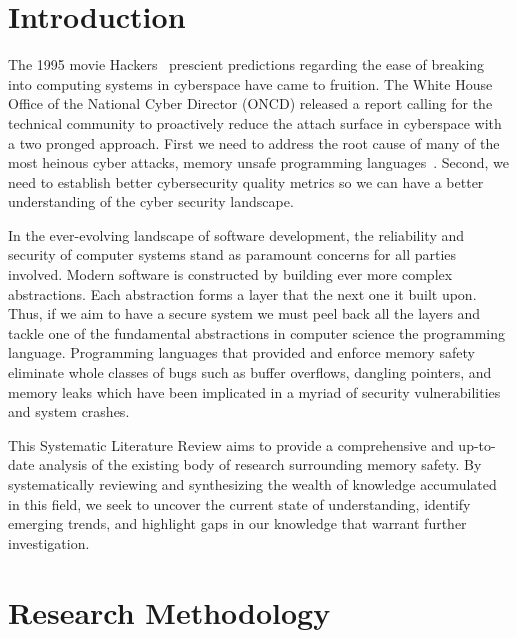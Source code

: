 \documentclass[sigconf]{acmart}
\begin{document}


\maketitle

\section{Introduction}

The 1995 movie Hackers~\cite{Wikipedia_contributors2024-zr} prescient predictions regarding the ease
of breaking into computing systems in cyberspace have came to fruition. The White House Office of
the National Cyber Director (ONCD) released a report calling for the technical community to
proactively reduce the attach surface in cyberspace with a two pronged approach. First we need to
address the root cause of many of the most heinous cyber attacks, memory unsafe programming
languages~\cite{United_States_Gov2024-pp}. Second, we need to establish better cybersecurity quality
metrics so we can have a better understanding of the cyber security landscape.

In the ever-evolving landscape of software development, the reliability and security of computer
systems stand as paramount concerns for all parties involved. Modern software is constructed by
building ever more complex abstractions. Each abstraction forms a layer that the next one it built
upon. Thus, if we aim to have a secure system we must peel back all the layers and tackle one of the
fundamental abstractions in computer science the programming language. Programming languages that
provided and enforce memory safety eliminate whole classes of bugs such as buffer overflows,
dangling pointers, and memory leaks which have been implicated in a myriad of security
vulnerabilities and system crashes.

This Systematic Literature Review aims to provide a comprehensive and up-to-date analysis of the
existing body of research surrounding memory safety. By systematically reviewing and synthesizing
the wealth of knowledge accumulated in this field, we seek to uncover the current state of
understanding, identify emerging trends, and highlight gaps in our knowledge that warrant further
investigation.


\section{Research Methodology}
\end{document}
